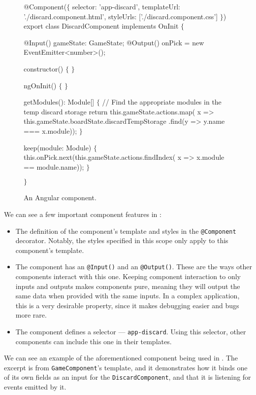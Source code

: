 \begin{figure}[ht]
\begin{code}[commandchars=\\\{\},codes={\catcode`\$=3\catcode`\^=7\catcode`\_=8}]
@Component($\{$
    selector: 'app-discard',
    templateUrl: './discard.component.html',
    styleUrls: ['./discard.component.css']
$\}$)
export class DiscardComponent implements OnInit $\{$

    @Input() gameState: GameState;
    @Output() onPick = new EventEmitter<number>();

    constructor() $\{$ $\}$

    ngOnInit() $\{$
    $\}$

    getModules(): Module[] $\{$
        // Find the appropriate modules in the temp discard storage
        return this.gameState.actions.map(
            x => this.gameState.boardState.discardTempStorage
                .find(y => y.name === x.module));
    $\}$

    keep(module: Module) $\{$
        this.onPick.next(this.gameState.actions.findIndex(
            x => x.module == module.name));
    $\}$

$\}$
\end{code}
\caption{An Angular component.}\label{dd:componentcode}
\end{figure}

We can see a few important component features in :
\begin{itemize}
    \item The definition of the component's template and styles
        in the \texttt{@Component} decorator. Notably, the styles
        specified in this scope only apply to this component's
        template.
    \item The component has an \texttt{@Input()} and an \texttt{@Output()}.
        These are the ways other components interact with this one.
        Keeping component interaction to only inputs and outputs makes
        components pure, meaning they will output the same data
        when provided with the same inputs. In a complex application,
        this is a very desirable property, since it makes debugging
        easier and bugs more rare.
    \item The component defines a selector --- \texttt{app-discard}.
        Using this selector, other components can include this one in
        their templates.
\end{itemize}

We can see an example of the aforementioned component being used in .
The excerpt is from \texttt{GameComponent}'s template, and it demonstrates how
it binds one of its own fields as an input for the \texttt{DiscardComponent},
and that it is listening for events emitted by it.

